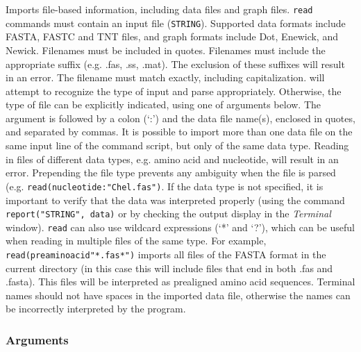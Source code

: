 	\begin{phygdescription}
		{Imports file-based information, including data files and graph files. \texttt{read} 
		commands must contain an input file (\texttt{STRING}). Supported data formats 
		include FASTA, FASTC and TNT files, and graph formats include Dot, Enewick, %
		and Newick. Filenames must be included in quotes. Filenames must include the 
		appropriate suffix (e.g. .fas, .ss, .mat). The exclusion of these suffixes will result 
		in an error. The filename must match exactly, including capitalization. \phyg will 
		attempt to recognize the type of input and parse appropriately. Otherwise, the 
		type of file can be explicitly indicated, using one of arguments below. The argument 
		is followed by a colon (`:') and the data file name(s), enclosed in quotes, and 
		separated by commas. It is possible to import more than one data file on the 
		same input line of the command script, but only of the same data type. Reading 
		in files of different data types, e.g. amino acid and nucleotide, will result in an 
		error. Prepending the file type prevents any ambiguity when the file is parsed
		(e.g. \texttt{read(nucleotide:"Chel.fas")}. If the data type is not specified, it is 
		important to verify that the data was interpreted properly (using the command 
		\texttt{report("STRING", data)} or by checking the output display in the 
		\textit{Terminal} window). \texttt{read} can also use wildcard expressions 
		(`*' and `?'), which can be useful when reading in multiple files of the 
		same type. For example, \texttt{read(preaminoacid"*.fas*")} imports all files of the 
		FASTA format in the current directory (in this case this will include files that end 
		in both .fas and .fasta). This files will be interpreted as prealigned amino acid
		sequences. Terminal names should not have spaces in the imported 
		data file, otherwise the names can be incorrectly interpreted by the program.} 
	\end{phygdescription}

	\subsubsection{Arguments}
	
